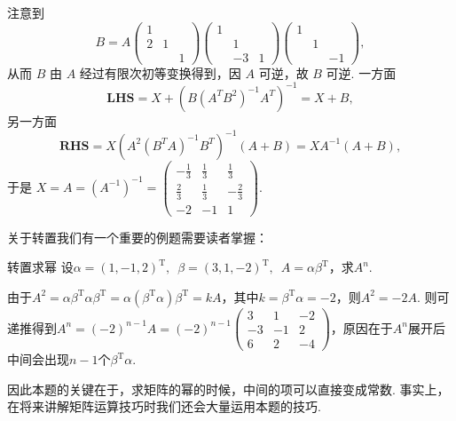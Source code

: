 \begin{solution}
    注意到
    \[B=A\begin{pmatrix}
            1 &  & \\ 2 & 1 & \\ & & 1
        \end{pmatrix} \begin{pmatrix}
            1 &  & \\ & 1 & \\ & -3 & 1
        \end{pmatrix} \begin{pmatrix}
            1 &  & \\ & 1 & \\ & & -1
        \end{pmatrix},\]
    从而 $B$ 由 $A$ 经过有限次初等变换得到，因 $A$ 可逆，故 $B$ 可逆. 一方面
    \[\textbf{LHS}=X+\left(B\left(A^{T} B^{2}\right)^{-1} A^{T}\right)^{-1}=X+B,\]
    另一方面
    \[\textbf{RHS}=X\left(A^{2}\left(B^{T} A\right)^{-1} B^{T}\right)^{-1}(A+B)=X A^{-1}(A+B),\]
    于是 $X=A=(A^{-1})^{-1}=\begin{pmatrix}
            -\frac{1}{3} & \frac{1}{3} & \frac{1}{3}  \\
            \frac{2}{3}  & \frac{1}{3} & -\frac{2}{3} \\
            -2           & -1          & 1
        \end{pmatrix}$.
\end{solution}

关于转置我们有一个重要的例题需要读者掌握：
\begin{example}{}{转置求幂}
    设$\alpha=(1,-1,2)^\mathrm{T},\enspace\beta=(3,1,-2)^\mathrm{T},\enspace A=\alpha\beta^\mathrm{T}$，求$A^n$.
\end{example}

\begin{solution}
    由于$A^2=\alpha\beta^\mathrm{T}\alpha\beta^\mathrm{T}=\alpha(\beta^\mathrm{T}\alpha)\beta^\mathrm{T}=kA$，其中$k=\beta^\mathrm{T}\alpha=-2$，则$A^2=-2A$. 则可递推得到$A^n=(-2)^{n-1}A=(-2)^{n-1}\begin{pmatrix}
            3 & 1 & -2 \\ -3 & -1 & 2 \\ 6 & 2 & -4
        \end{pmatrix}$，原因在于$A^n$展开后中间会出现$n-1$个$\beta^\mathrm{T}\alpha$.
\end{solution}

因此本题的关键在于，求矩阵的幂的时候，中间的项可以直接变成常数. 事实上，在将来讲解矩阵运算技巧时我们还会大量运用本题的技巧.

